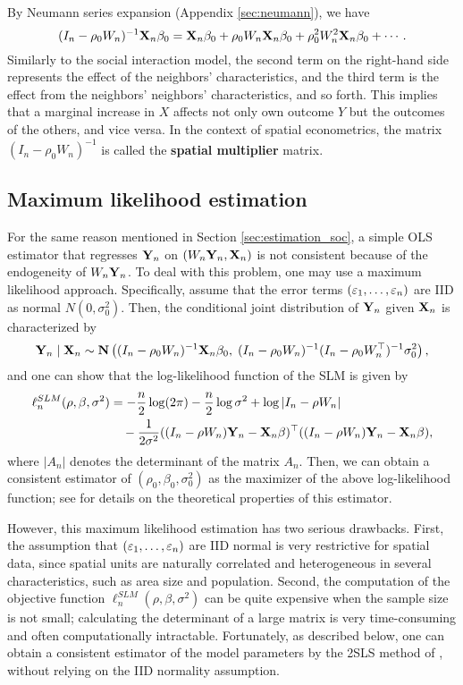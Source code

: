 \documentclass[11pt, A4paper, openany, uplatex]{book}
\begin{document}
By Neumann series expansion (Appendix \ref{sec:neumann}), we have 
\[
	(I_n - \rho_0 W_n)^{-1}\mathbf{X}_n\beta_0 = \mathbf{X}_n\beta_0 + \rho_0 W_n \mathbf{X}_n\beta_0 + \rho_0^2 W_n^2\mathbf{X}_n\beta_0 + \cdots.
\]
Similarly to the social interaction model, the second term on the right-hand side represents the effect of the neighbors' characteristics, and the third term is the effect from the neighbors' neighbors' characteristics, and so forth.
This implies that a marginal increase in $X$ affects not only own outcome $Y$ but the outcomes of the others, and vice versa.
In the context of spatial econometrics, the matrix $(I_n - \rho_0 W_n)^{-1} $ is called the \textbf{spatial multiplier} matrix.

\subsection{Maximum likelihood estimation}

 For the same reason mentioned in Section \ref{sec:estimation_soc}, a simple OLS estimator that regresses $\mathbf{Y}_n$ on $(W_n \mathbf{Y}_n, \mathbf{X}_n)$ is not consistent because of the endogeneity of $W_n \mathbf{Y}_n$.
 To deal with this problem, one may use a maximum likelihood approach.
 Specifically, assume that the error terms $(\varepsilon_1, \ldots , \varepsilon_n)$ are IID as normal $N(0, \sigma_0^2)$.
 Then, the conditional joint distribution of $\mathbf{Y}_n$ given $\mathbf{X}_n$ is characterized by
 \[
 	\mathbf{Y}_n \mid \mathbf{X}_n \sim \mathbf{N}\left( (I_n - \rho_0 W_n)^{-1}\mathbf{X}_n \beta_0, \; (I_n - \rho_0 W_n)^{-1}(I_n - \rho_0 W_n^\top)^{-1}\sigma_0^2\right),
 \]
and one can show that the log-likelihood function of the SLM is given by
\begin{align*}
 	\ell^{SLM}_n(\rho, \beta, \sigma^2) 
 	&= -\frac{n}{2} \log (2\pi) -\frac{n}{2} \log\sigma^2 + \log | I_n - \rho W_n| \\
 	& \quad - \frac{1}{2\sigma^2} ((I_n - \rho W_n)\mathbf{Y}_n - \mathbf{X}_n \beta)^\top ((I_n - \rho W_n)\mathbf{Y}_n - \mathbf{X}_n \beta),
 \end{align*}
where $|A_n|$ denotes the determinant of the matrix $A_n$.
Then, we can obtain a consistent estimator of $(\rho_0, \beta_0, \sigma_0^2)$ as the maximizer of the above log-likelihood function; see \cite{lee2004asymptotic} for details on the theoretical properties of this estimator.

However, this maximum likelihood estimation has two serious drawbacks.
First, the assumption that $(\varepsilon_1, \ldots , \varepsilon_n)$ are IID normal is very restrictive for spatial data, since spatial units are naturally correlated and heterogeneous in several characteristics, such as area size and population.
Second, the computation of the objective function $\ell^{SLM}_n(\rho, \beta, \sigma^2)$ can be quite expensive when the sample size is not small; calculating the determinant of a large matrix is very time-consuming and often computationally intractable.
Fortunately, as described below, one can obtain a consistent estimator of the model parameters by the 2SLS method of \cite{kelejian1998generalized}, without relying on the IID normality assumption.
\end{document}
